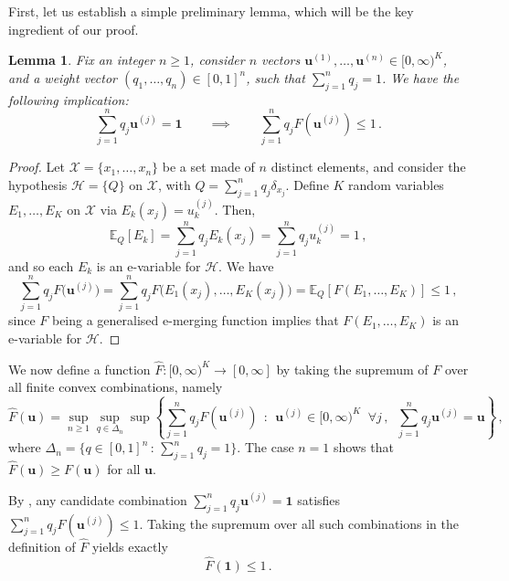 \documentclass[3p, authoryear, 10pt]{elsarticle}%
\newtheorem{lemma}{Lemma}
\newcommand{\E}{\mathbb E}
\newcommand{\Hh}{\mathcal H}
\newcommand{\X}{\mathcal X}
\begin{document}
First, let us establish a simple preliminary lemma, which will be the key ingredient of our proof. 
\begin{lemma}\label{lemma}
    Fix an integer $n\geq 1$, consider $n$ vectors $\mathbf{u}^{(1)},\dots, \mathbf{u}^{(n)}\in [0,\infty)^K$, and a weight vector $(q_1,\dots, q_n)\in[0,1]^n$, such that $\sum_{j=1}^n q_j =1$. We have the following implication: $$\sum_{j=1}^n q_j \mathbf{u}^{(j)}= \mathbf{1}\qquad\implies\qquad\sum_{j=1}^n q_j F(\mathbf{u}^{(j)})\leq 1\,.$$
\end{lemma}
\begin{proof}
    Let $\X = \{x_1,\dots, x_n\}$ be a  set made of $n$ distinct elements, and consider the hypothesis $\Hh = \{Q\}$ on $\X$, with $Q = \sum_{j=1}^n q_j \delta_{x_j}$. Define $K$ random variables $E_1,\dots, E_K$ on $\X$ via $E_k(x_j) = u^{(j)}_k$. Then, 
    $$\E_Q[E_k] = \sum_{j=1}^n q_j E_k(x_j) = \sum_{j=1}^n q_j u^{(j)}_k = 1\,,$$ and so each $E_k$ is an e-variable for $\Hh$. We have
    $$\sum_{j=1}^n q_j F\big(\mathbf{u}^{(j)}\big) = \sum_{j=1}^n q_j F\big(E_1(x_j),\dots, E_K(x_j)\big) = \E_Q[F(E_1,\dots, E_K)] \leq1\,,$$ since $F$ being a generalised e-merging function implies that $F(E_1,\dots, E_K)$ is an e-variable for $\Hh$.
\end{proof}

We now define a function $\hat F:[0,\infty)^K\to[0,\infty]$ by taking the supremum of $F$ over all finite convex combinations, namely
$$\hat F(\mathbf{u}) = \sup_{n\geq 1}\sup_{q\in \Delta_n}\sup\left\{\sum_{j=1}^n q_j F(\mathbf{u}^{(j)})\,\;:\,\;\mathbf{u}^{(j)}\in[0,\infty)^K\;\;\forall j\,,\;\;\sum_{j=1}^n q_j\mathbf{u}^{(j)} =  \mathbf{u}\right\}\,,$$
where $\Delta_n = \{q\in[0,1]^n\,:\,\sum_{j=1}^n q_j=1\}$. The case $n=1$ shows that $\hat F(\mathbf{u}) \geq F(\mathbf{u})$ for all $\mathbf{u}$.

By , any candidate combination $\sum_{j=1}^n q_j \mathbf{u}^{(j)} = \mathbf{1}$ satisfies $\sum_{j=1}^n q_j F(\mathbf{u}^{(j)}) \leq 1$. Taking the supremum over all such combinations in the definition of $\hat F$ yields exactly
$$\hat F(\mathbf{1}) \leq 1\,.$$
\end{document}
